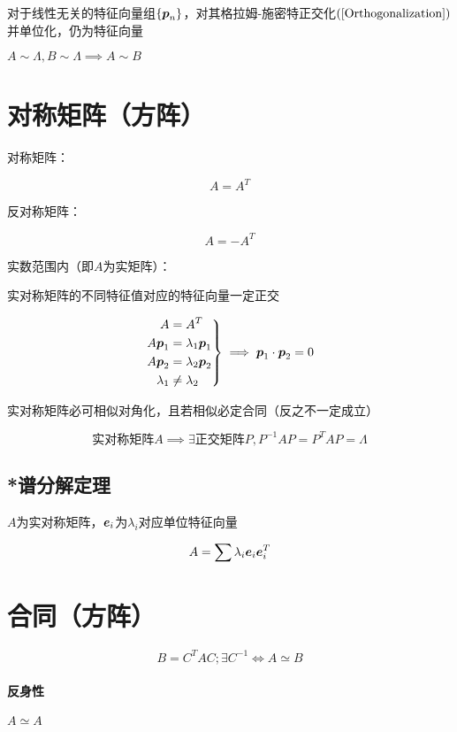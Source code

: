 \documentclass{article}
\begin{document}
对于线性无关的特征向量组$\left\{\boldsymbol p_n\right\}$，对其格拉姆-施密特正交化$\left(\ref{Orthogonalization}\right)$并单位化，仍为特征向量

$A\sim\Lambda,B\sim\Lambda\implies A\sim B$

\section{对称矩阵（方阵）}

\begin{definition}
    对称矩阵：

    \[A=A^T\]

    反对称矩阵：

    \[A=-A^T\]
\end{definition}

实数范围内（即$A$为实矩阵）：

实对称矩阵的不同特征值对应的特征向量一定正交

\[\left.\begin{aligned}
        A         & =A^T            \\
        A\boldsymbol p_1    & =\lambda_1\boldsymbol p_1 \\
        A\boldsymbol p_2    & =\lambda_2\boldsymbol p_2 \\
        \lambda_1 & \neq\lambda_2
    \end{aligned}\right\}
    \implies \boldsymbol p_1\cdot\boldsymbol p_2=0\]

实对称矩阵必可相似对角化，且若相似必定合同（反之不一定成立）

\[\text{实对称矩阵}A\implies
    \exists\text{正交矩阵}P,P^{-1}AP=P^TAP=\Lambda\]

\subsection{*谱分解定理}

$A$为实对称矩阵，$\boldsymbol e_i$为$\lambda_i$对应单位特征向量

\[A=\sum\lambda_i\boldsymbol e_i\boldsymbol e^T_i\]

\section{合同（方阵）}

\begin{definition}
    \[B=C^TAC;\exists C^{-1}\iff A\simeq B\]
\end{definition}

\paragraph{反身性}$A\simeq A$
\end{document}
